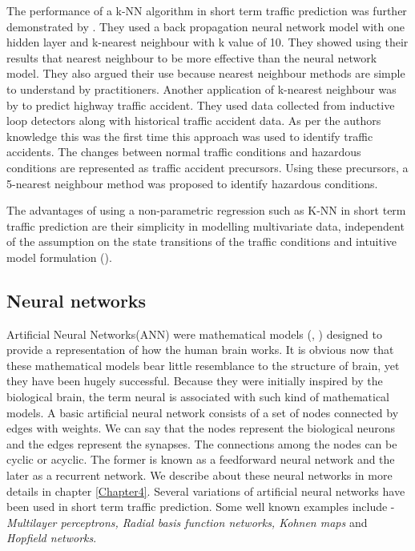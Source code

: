 The performance of a k-NN algorithm in short term traffic prediction was further demonstrated by
\citet{smith1994comparison}. They used a back propagation neural network model with one hidden layer
and k-nearest neighbour with k value of 10. They showed using their results that nearest neighbour
to be more effective than the neural network model. They also argued their use because nearest
neighbour methods are simple to understand by practitioners. Another application of k-nearest neighbour
was by \citet{lv2009real} to predict highway traffic accident. They used data collected from
inductive loop detectors along with historical traffic accident data. As per the authors knowledge
this was the first time this approach was used to identify traffic accidents. The changes between
normal traffic conditions and hazardous conditions are represented as traffic accident precursors.
Using these precursors, a 5-nearest neighbour method was proposed to identify hazardous conditions.

The advantages of using a non-parametric regression such as K-NN in short term traffic prediction
are their simplicity in modelling multivariate data, independent of the assumption on the state
transitions of the traffic conditions and intuitive model formulation (\citet{vlahogianni2004short}).

\subsection{Neural networks}
\label{subsec:neuralNetworksTrafficPred}
Artificial Neural Networks(ANN) were mathematical models (\citet{mcculloch1943logical},
\citet{rosenblatt1958perceptron}) designed to  provide a representation of how the human brain
works. It is obvious now that these mathematical models bear little resemblance to the structure
of brain, yet they have been hugely successful. Because they were initially inspired by the
biological brain, the term neural is associated with such kind of mathematical models. A basic
artificial neural network consists of a set of nodes connected by edges with weights. We can say
that the nodes represent the biological neurons and the edges represent the synapses. The
connections among the nodes can be cyclic or acyclic. The former is known as a feedforward neural
network and the later as a recurrent network. We describe about these neural networks in more
details in chapter \ref{Chapter4}. Several variations of artificial neural networks have been
used in short term traffic prediction. Some well known examples include - \textit{Multilayer
perceptrons, Radial basis function networks, Kohnen maps} and \textit{Hopfield networks}.

